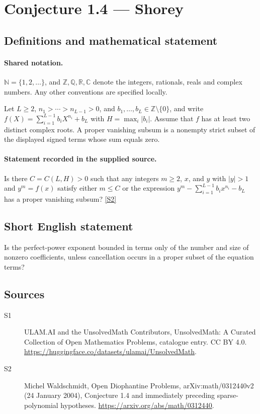 \documentclass[11pt]{article}
\newcommand{\sref}[2]{\hyperlink{source:#1:#2}{[S#2]}}
\begin{document}
\section{Conjecture 1.4 — Shorey}\label{statement}

\subsection{Definitions and mathematical statement}

\paragraph{Shared notation.}$\mathbb N=\{1,2,\ldots\}$, and $\mathbb Z,\mathbb Q,\mathbb R,\mathbb C$ denote the integers, rationals, reals and complex numbers. Any other conventions are specified locally.


Let $L\ge2$, $n_1>\cdots>n_{L-1}>0$, and $b_1,\ldots,b_L\in\mathbb Z\setminus\{0\}$, and write $f(X)=\sum_{i=1}^{L-1}b_iX^{n_i}+b_L$ with $H=\max_i|b_i|$. Assume that $f$ has at least two distinct complex roots. A proper vanishing subsum is a nonempty strict subset of the displayed signed terms whose sum equals zero.
\paragraph{Statement recorded in the supplied source.}
Is there $C=C(L,H)>0$ such that any integers $m\ge2$, $x$, and $y$ with $|y|>1$ and $y^m=f(x)$ satisfy either $m\le C$ or the expression $y^m-\sum_{i=1}^{L-1}b_i x^{n_i}-b_L$ has a proper vanishing subsum? \sref{statement}{2}
\subsection{Short English statement}
Is the perfect-power exponent bounded in terms only of the number and size of nonzero coefficients, unless cancellation occurs in a proper subset of the equation terms?
\subsection{Sources}
\begin{description}
\item[\hypertarget{source:statement:1}{S1}] ULAM.AI and the UnsolvedMath Contributors, UnsolvedMath: A Curated Collection of Open Mathematics Problems, catalogue entry. CC BY 4.0. \url{https://huggingface.co/datasets/ulamai/UnsolvedMath}.
\item[\hypertarget{source:statement:2}{S2}] Michel Waldschmidt, Open Diophantine Problems, arXiv:math/0312440v2 (24 January 2004), Conjecture 1.4 and immediately preceding sparse-polynomial hypotheses. \url{https://arxiv.org/abs/math/0312440}.
\end{description}
\label{end:statement}
\end{document}
